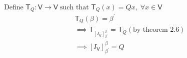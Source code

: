 Define $\mathsf{T}_Q \colon \mathsf{V}\to\mathsf{V}\;\text{such that }
\mathsf{T}_Q(x) = Qx,\; \forall x \in \mathsf{V}$
\begin{gather}
\mathsf{T}_Q(\beta) = \beta^\prime\\
\implies \mathsf{T}_{[I_\mathsf{V}]_{\beta^\prime}^\beta} =
  \mathsf{T}_Q (\text{by theorem 2.6})\\
\implies [I_\mathsf{V}]_{\beta^\prime}^\beta = Q
\end{gather}

